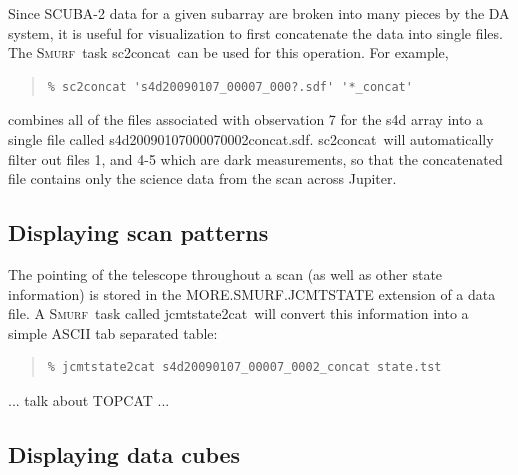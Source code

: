 \documentclass[twoside,11pt]{article}
\newenvironment{myquote}{\begin{quote}\begin{small}}{\end{small}\end{quote}}
\newcommand{\smurf}{\xref{\textsc{Smurf}}{sun258}{}}
\newcommand{\task}[1]{\textsf{#1}}
\newcommand{\concat}{\xref{\task{sc2concat}}{sun258}{SC2CONCAT}}
\newcommand{\jcmtstate}{\xref{\task{jcmtstate2cat}}{sun258}{JCMTSTATE2CAT}}
\newcommand{\xref}[3]{#1}
\newcommand{\xlabel}[1]{}
\renewcommand{\_}{\texttt{\symbol{95}}}
\begin{document}
Since SCUBA-2 data for a given subarray are broken into many pieces by
the DA system, it is useful for visualization to first concatenate the
data into single files. The \smurf\ task \concat\ can be used for this
operation. For example,

\begin{myquote}
\begin{verbatim}
% sc2concat 's4d20090107_00007_000?.sdf' '*_concat' 
\end{verbatim}
\end{myquote}

combines all of the files associated with observation 7 for the s4d
array into a single file called
s4d20090107\_00007\_0002\_concat.sdf. \concat\ will automatically
filter out files 1, and 4-5 which are dark measurements, so that the
concatenated file contains only the science data from the scan across
Jupiter. 

\subsection{\xlabel{display_scan}Displaying scan patterns}

The pointing of the telescope throughout a scan (as well as other
state information) is stored in the MORE.SMURF.JCMTSTATE extension of
a data file. A \smurf\ task called \jcmtstate\ will convert this
information into a simple ASCII tab separated table:

\begin{myquote}
\begin{verbatim}
% jcmtstate2cat s4d20090107_00007_0002_concat state.tst
\end{verbatim}
\end{myquote}

... talk about TOPCAT ...

\subsection{\xlabel{display_cube}Displaying data cubes} 
\end{document}
